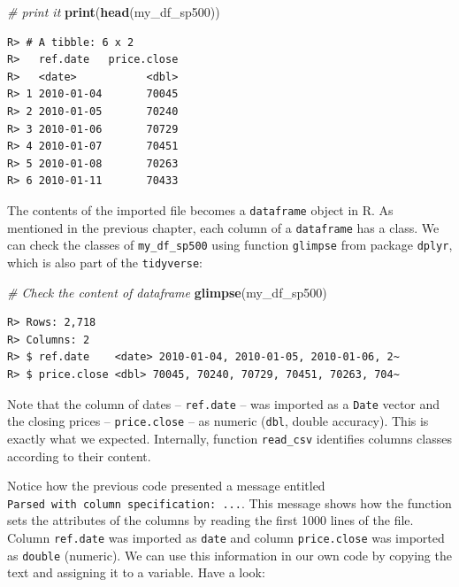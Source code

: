 \documentclass[
  12pt,
]{book}
\newenvironment{Shaded}{\begin{snugshade}}{\end{snugshade}}
\newcommand{\CommentTok}[1]{\textcolor[rgb]{0.37,0.37,0.37}{\textit{#1}}}
\newcommand{\KeywordTok}[1]{\textcolor[rgb]{0.27,0.27,0.27}{\textbf{#1}}}
\newcommand{\NormalTok}[1]{#1}
\begin{document}
\begin{Shaded}
\begin{Highlighting}[]
\CommentTok{# print it}
\KeywordTok{print}\NormalTok{(}\KeywordTok{head}\NormalTok{(my_df_sp500))}
\end{Highlighting}
\end{Shaded}

\begin{verbatim}
R> # A tibble: 6 x 2
R>   ref.date   price.close
R>   <date>           <dbl>
R> 1 2010-01-04       70045
R> 2 2010-01-05       70240
R> 3 2010-01-06       70729
R> 4 2010-01-07       70451
R> 5 2010-01-08       70263
R> 6 2010-01-11       70433
\end{verbatim}

The contents of the imported file becomes a \texttt{dataframe} object in R. As mentioned in the previous chapter, each column of a \texttt{dataframe} has a class. We can check the classes of \texttt{my\_df\_sp500} using function \texttt{glimpse} from package \texttt{dplyr}, which is also part of the \texttt{tidyverse}:

\begin{Shaded}
\begin{Highlighting}[]
\CommentTok{# Check the content of dataframe}
\KeywordTok{glimpse}\NormalTok{(my_df_sp500)}
\end{Highlighting}
\end{Shaded}

\begin{verbatim}
R> Rows: 2,718
R> Columns: 2
R> $ ref.date    <date> 2010-01-04, 2010-01-05, 2010-01-06, 2~
R> $ price.close <dbl> 70045, 70240, 70729, 70451, 70263, 704~
\end{verbatim}

Note that the column of dates -- \texttt{ref.date} -- was imported as a \texttt{Date} vector and the closing prices -- \texttt{price.close} -- as numeric (\texttt{dbl}, double accuracy). This is exactly what we expected. Internally, function \texttt{read\_csv} identifies columns classes according to their content.

Notice how the previous code presented a message entitled \texttt{Parsed\ with\ column\ specification:\ ...}. This message shows how the function sets the attributes of the columns by reading the first 1000 lines of the file. Column \texttt{ref.date} was imported as \texttt{date} and column \texttt{price.close} was imported as \texttt{double} (numeric). We can use this information in our own code by copying the text and assigning it to a variable. Have a look:
\end{document}
